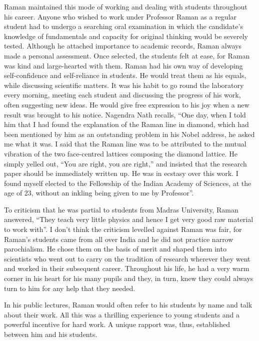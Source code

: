 Raman maintained this mode of working and dealing with students throughout his career. Anyone who wished to work under Professor Raman as a regular student had to undergo a searching oral examination in which the candidate's knowledge of fundamentals and capacity for original thinking would be severely tested. Although he attached importance to academic records, Raman always made a personal assessment. Once selected, the students felt at ease, for Raman was kind and large-hearted with them. Raman had his own way of developing self-confidence and self-reliance in students. He would treat them as his equals, while discussing scientific matters. It was his habit to go round the laboratory every morning, meeting each student and discussing the progress of his work, often suggesting new ideas. He would give free expression to his joy when a new result was brought to his notice. Nagendra Nath recalls, ``One day, when I told him that I had found the explanation of the Raman line in diamond, which had been mentioned by him as an outstanding problem in his Nobel address, he asked me what it was. I said that the Raman line was to be attributed to the mutual vibration of the two face-centred lattices composing the diamond lattice. He simply yelled out, ``You are right, you are right,'' and insisted that the research paper should be immediately written up. He was in ecstasy over this work. I found myself elected to the Fellowship of the Indian Academy of Sciences, at the age of 23, without an inkling being given to me by Professor''.

\newpage

To criticism that he was partial to students from Madras University, Raman answered, ``They teach very little physics and hence I get very good raw material to work with''. I don't think the criticism levelled against Raman was fair, for Raman's students came from all over India and he did not practice narrow parochialism. He chose them on the basis of merit and shaped them into scientists who went out to carry on the tradition of research wherever they went and worked in their subsequent career. Throughout his life, he had a very warm corner in his heart for his many pupils and they, in turn, knew they could always turn to him for any help that they needed.

In his public lectures, Raman would often refer to his students by name and talk about their work. All this was a thrilling experience to young students and a powerful incentive for hard work. A unique rapport was, thus, established between him and his students.

